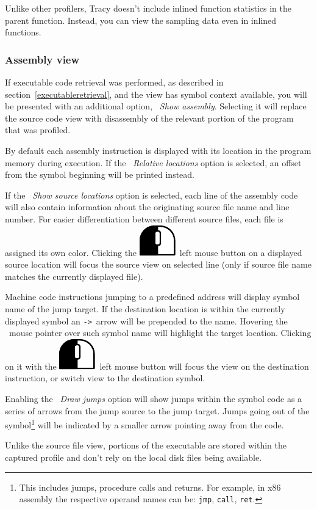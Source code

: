 \documentclass[hidelinks,titlepage,a4paper]{article}
\newcommand{\LMB}{\includegraphics[height=.8\baselineskip]{icons/lmb}}
\begin{document}
Unlike other profilers, Tracy doesn't include inlined function statistics in the parent function. Instead, you can view the sampling data even in inlined functions.

\subsubsection{Assembly view}

If executable code retrieval was performed, as described in section~\ref{executableretrieval}, and the view has symbol context available, you will be presented with an additional option, \emph{\faMicrochip{}~Show assembly}. Selecting it will replace the source code view with disassembly of the relevant portion of the program that was profiled.

By default each assembly instruction is displayed with its location in the program memory during execution. If the \emph{\faSearchLocation{}~Relative locations} option is selected, an offset from the symbol beginning will be printed instead.

If the \emph{\faFileImport{}~Show source locations} option is selected, each line of the assembly code will also contain information about the originating source file name and line number. For easier differentiation between different source files, each file is assigned its own color. Clicking the \LMB{}~left mouse button on a displayed source location will focus the source view on selected line (only if source file name matches the currently displayed file).

Machine code instructions jumping to a predefined address will display symbol name of the jump target. If the destination location is within the currently displayed symbol an \texttt{->}~arrow will be prepended to the name. Hovering the \faMousePointer{}~mouse pointer over such symbol name will highlight the target location. Clicking on it with the \LMB{}~left mouse button will focus the view on the destination instruction, or switch view to the destination symbol.

Enabling the \emph{\faShare{}~Draw jumps} option will show jumps within the symbol code as a series of arrows from the jump source to the jump target. Jumps going out of the symbol\footnote{This includes jumps, procedure calls and returns. For example, in x86 assembly the respective operand names can be: \texttt{jmp}, \texttt{call}, \texttt{ret}.} will be indicated by a smaller arrow pointing away from the code.

Unlike the source file view, portions of the executable are stored within the captured profile and don't rely on the local disk files being available.
\end{document}
